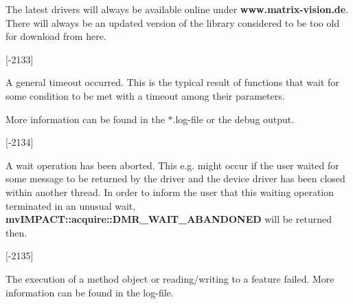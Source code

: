 \begin{Desc}
\begin{description}
The latest drivers will always be available online under {\bfseries www.\+matrix-\/vision.\+de}. There will always be an updated version of the library considered to be too old for download from here.

{\bfseries }\mbox{[}-\/2133\mbox{]} \item[{\em 
\hypertarget{group___common_interface_gga112225e5fbaaaef6445ff4ebf98f8e03a66126162a7d097c50a288e481ba92e5a}{D\+M\+R\+\_\+\+T\+I\+M\+E\+O\+U\+T}\label{group___common_interface_gga112225e5fbaaaef6445ff4ebf98f8e03a66126162a7d097c50a288e481ba92e5a}
}]A general timeout occurred. This is the typical result of functions that wait for some condition to be met with a timeout among their parameters.

More information can be found in the $\ast$.log-\/file or the debug output.

{\bfseries }\mbox{[}-\/2134\mbox{]} \item[{\em 
\hypertarget{group___common_interface_gga112225e5fbaaaef6445ff4ebf98f8e03aa59c26a75ea9a9e3127b1d8fa407be74}{D\+M\+R\+\_\+\+W\+A\+I\+T\+\_\+\+A\+B\+A\+N\+D\+O\+N\+E\+D}\label{group___common_interface_gga112225e5fbaaaef6445ff4ebf98f8e03aa59c26a75ea9a9e3127b1d8fa407be74}
}]A wait operation has been aborted. This e.\+g. might occur if the user waited for some message to be returned by the driver and the device driver has been closed within another thread. In order to inform the user that this waiting operation terminated in an unusual wait, {\bfseries mv\+I\+M\+P\+A\+C\+T\+::acquire\+::\+D\+M\+R\+\_\+\+W\+A\+I\+T\+\_\+\+A\+B\+A\+N\+D\+O\+N\+E\+D} will be returned then.

{\bfseries }\mbox{[}-\/2135\mbox{]} \item[{\em 
\hypertarget{group___common_interface_gga112225e5fbaaaef6445ff4ebf98f8e03a8921c061aff256e92d55a0f9245d1102}{D\+M\+R\+\_\+\+E\+X\+E\+C\+U\+T\+I\+O\+N\+\_\+\+F\+A\+I\+L\+E\+D}\label{group___common_interface_gga112225e5fbaaaef6445ff4ebf98f8e03a8921c061aff256e92d55a0f9245d1102}
}]The execution of a method object or reading/writing to a feature failed. More information can be found in the log-\/file.


\end{description}
\end{Desc}
